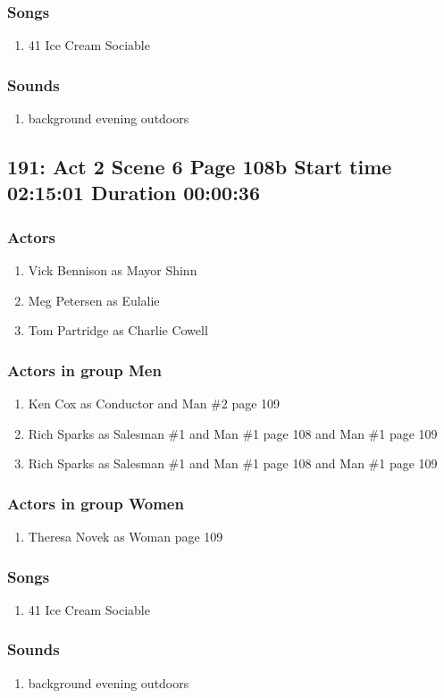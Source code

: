 \subsubsection{Songs}
\begin{enumerate}
\item 41 Ice Cream Sociable
\end{enumerate}\subsubsection{Sounds}
\begin{enumerate}
\item background evening outdoors
\end{enumerate}
\subsection{191: Act 2 Scene 6 Page 108b Start time 02:15:01 Duration 00:00:36}

\subsubsection{Actors}
\begin{enumerate}
\item Vick Bennison as Mayor Shinn
\item Meg Petersen as Eulalie
\item Tom Partridge as Charlie Cowell
\end{enumerate}
\subsubsection{Actors in group Men}
\begin{enumerate}
\item Ken Cox as Conductor and Man \#2 page 109
\item Rich Sparks as Salesman \#1 and Man \#1 page 108 and Man \#1 page 109
\item Rich Sparks as Salesman \#1 and Man \#1 page 108 and Man \#1 page 109
\end{enumerate}
\subsubsection{Actors in group Women}
\begin{enumerate}
\item Theresa Novek as Woman page 109
\end{enumerate}

\subsubsection{Songs}
\begin{enumerate}
\item 41 Ice Cream Sociable
\end{enumerate}\subsubsection{Sounds}
\begin{enumerate}
\item background evening outdoors
\end{enumerate}
